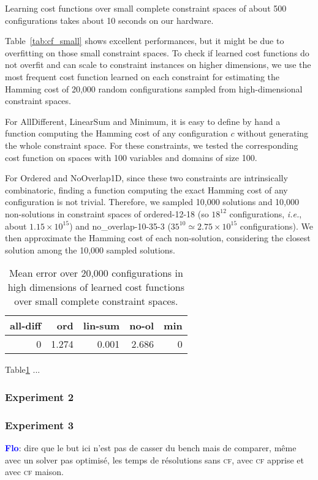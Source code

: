 \documentclass{article}
\newcommand{\ie}{\textit{i.e.}}
\newcommand{\cf}{\textsc{cf}\xspace}
\newcommand{\flo}{\textcolor{blue}{\bf Flo}\xspace}
\begin{document}
Learning cost functions over small complete constraint spaces of about 500 configurations takes about 10 seconds on our hardware.

Table~\ref{tab:cf_small} shows excellent performances, but it might be due to overfitting on those small constraint spaces.  To check if learned cost functions do not overfit and can scale to constraint instances on higher dimensions, we use the most frequent cost function learned on each constraint for estimating the Hamming cost of 20,000 random configurations sampled from high-dimensional constraint spaces.

For AllDifferent, LinearSum and Minimum, it is easy to define by hand a function computing the Hamming cost of any configuration $c$ without generating the whole constraint space.  For these constraints,  we tested the corresponding cost function on spaces with  100 variables and domains of size 100.

For  Ordered and  NoOverlap1D,  since these two constraints are intrinsically combinatoric, finding a function computing the exact Hamming cost of any configuration is not trivial.  Therefore,  we sampled 10,000 solutions and 10,000 non-solutions in constraint spaces of   ordered-12-18   (so    $18^{12}$   configurations,   \ie,   about $1.15\times         10^{15}$)          and         no\_overlap-10-35-3 ($35^{10}  \simeq   2.75\times  10^{15}$  configurations).    We then approximate the Hamming cost of each non-solution,  considering the closest solution among the 10,000 sampled solutions.

\begin{table}
  \centering
\begin{tabular}{|r|r|r|r|r|}
  \hline
  all-diff & ord & lin-sum & no-ol & min\\
  \hline
  0 & 1.274 & 0.001 & 2.686 & 0\\
  \hline
\end{tabular}
\caption{Mean error  over 20,000 configurations in  high dimensions of
  learned cost functions over small complete constraint spaces.}
\label{tab:cf_scale}
\end{table}

Table\ref{tab:cf_scale} ...

\subsubsection{Experiment 2}

\subsubsection{Experiment 3}
\flo:  dire que  le but  ici  n'est pas  de  casser du  bench mais  de
comparer, même avec un solver  pas optimisé, les temps de résolutions
sans \cf, avec \cf apprise et avec \cf maison.
\end{document}

